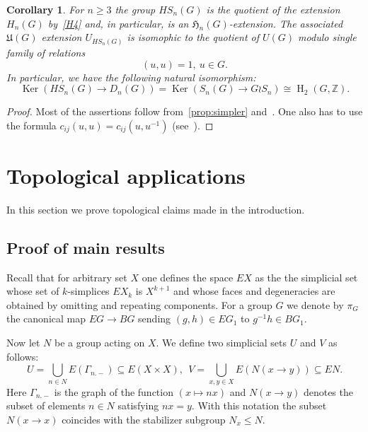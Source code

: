 \documentclass[oneside, 12pt]{amsart}
\theoremstyle{plain}
\numberwithin{equation}{section}
\numberwithin{lemma}{section}
\newtheorem{cor}[lemma]{Corollary}
\theoremstyle{remark}
\theoremstyle{definition}
\DeclareMathOperator{\HH}{H}
\DeclareMathOperator{\Ker}{Ker}
\newcommand{\ZZ}{\mathbb{Z}}
\begin{document}
\begin{cor} \label{cor:main} For $n \geq 3$ the group $HS_n(G)$ is the quotient of the extension $H_n(G)$ by~\eqref{H4} and, in particular, is an $\mathfrak{H}_n(G)$-extension.
The associated $\mathfrak{U}(G)$ extension $U_{HS_n(G)}$ is isomophic to the quotient of $U(G)$ modulo single family of relations
\begin{equation} \nonumber (u, u) = 1, \ u\in G. \end{equation}
In particular, we have the following natural isomorphism:
\begin{equation} \Ker(HS_n(G) \to D_n(G)) = \Ker(S_n(G) \to G \wr S_n) \cong \HH_2(G, \ZZ). \end{equation} \end{cor}
\begin{proof}
Most of the assertions follow from~\cref{prop:simpler} and~\cite[Proposition~5]{De76}.
One also has to use the formula $c_{ij}(u, u) = c_{ij}(u, u^{-1})$ (see~\cite[p.~87]{Reh78}).
\end{proof}

\section{Topological applications} \label{sec:main}
In this section we prove topological claims made in the introduction.
\subsection{Proof of main results}
Recall that for arbitrary set $X$ one defines the space $EX$ as the the simplicial set whose set of $k$-simplices $EX_k$
 is $X^{k+1}$ and whose faces and degeneracies are obtained by omitting and repeating components. 
For a group $G$ we denote by $\pi_G$ the canonical map $EG \to BG$ sending $(g, h) \in EG_1$ to $g^{-1}h \in BG_1$.
 
Now let $N$ be a group acting on $X$. We define two simplicial sets $U$ and $V$ as follows:
\[ U = \bigcup\limits_{n\in N} E(\Gamma_{n.-}) \subseteq E(X\times X),\ \ V = \bigcup\limits_{x,y\in X}E(N(x\to y)) \subseteq EN. \]
Here $\Gamma_{n.-}$ is the graph of the function $(x \mapsto nx)$ and $N(x\to y)$ denotes the subset of elements $n\in N$ satisfying $nx=y$.
With this notation the subset $N(x\to x)$ coincides with the stabilizer subgroup $N_x \leq N$.
\end{document}
